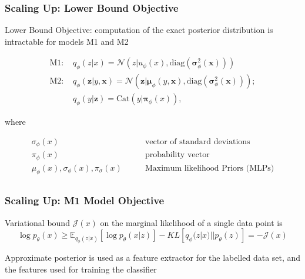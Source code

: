 \documentclass{beamer}
\begin{document}
\begin{frame}
  \frametitle{Scaling Up: Lower Bound Objective}

  Lower Bound Objective\footnotemark: computation of the exact posterior
  distribution is intractable for models M1 and M2
  
  \begin{align*}
    \text{M1: } &q_\phi (z|x) = \mathcal{N}(z|u_\phi (x),
    \text{diag}(\mathbf{\sigma}_\phi^2 (\mathbf{x}))) \tag{3}\\
    \text{M2: } &q_\phi(\mathbf{z}|y,\mathbf{x}) =
    \mathcal{N}(\mathbf{z}|\mathbf{\mu}_\phi (y, \mathbf{x}),
    \text{diag}(\mathbf{\sigma}_\phi^2(\mathbf{x}))); \\
    &q_\phi (y|\mathbf{z}) = \text{Cat}(y|\mathbf{\pi}_\phi (x)), \tag{4}
  \end{align*}

  where

  \begin{align*}
    \sigma_\phi (x) &\qquad \text{vector of standard deviations} \\
    \pi_\phi(x) &\qquad \text{probability vector} \\
    \mu_\phi(x), \sigma_\phi(x), \pi_\sigma (x)  &\qquad
    \text{Maximum likelihood Priors (MLPs)} \\
    \end{align*}

\end{frame}

\begin{frame}
  \frametitle{Scaling Up: M1 Model Objective}

  Variational bound $\mathcal{J}(x)$ on the marginal likelihood of
  a single data point is\footnotemark
  \[
  \log p_\theta (x) \ge \mathbb{E}_{q_\phi (z|x)}
       [\log p_\theta (x|z)] - KL[q_\phi (z|x)||p_\theta (z)]
       = - \mathcal{J}(x)
   \]

   Approximate posterior is used as a feature extractor for the
   labelled data set, and the features used for training the
   classifier

\end{frame}
\end{document}
